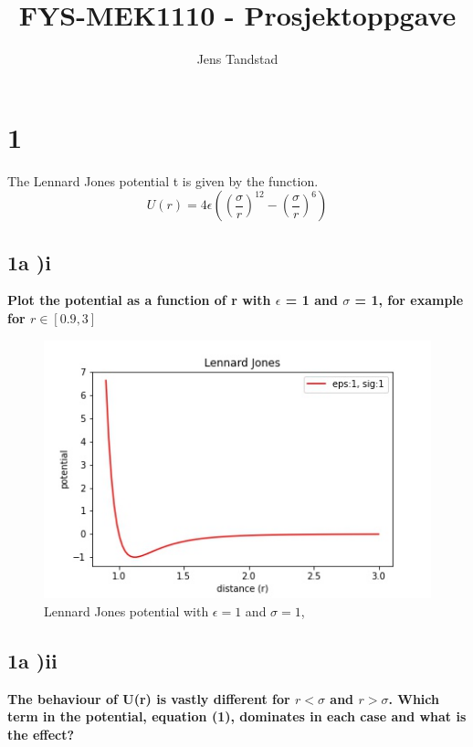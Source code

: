 \documentclass[a4paper,10pt,english]{article}
\title{FYS-MEK1110 - Prosjektoppgave}
\author{Jens Tandstad}
\begin{document}
\maketitle
\newpage

\section*{1}
The Lennard Jones potential t is given by the function.
\begin{equation}
U(r) = 4\epsilon \left(   (\frac{\sigma}{r})^{12} -   (\frac{\sigma}{r})^6 \right)
\end{equation}

\subsection*{1a )i}
\textbf{Plot the potential as a function of r with $\epsilon$ = 1 and $\sigma$ = 1, for example for $r \in [0.9, 3]$}
\begin{figure}[h!]
        \centering 
        \includegraphics[scale=0.6]{1a_i.jpg} 
        \caption{Lennard Jones potential with $\epsilon = 1$ and $\sigma = 1$, }
        \label{fig:eksempelbilde1}
\end{figure}

\subsection*{1a )ii}
\textbf{The behaviour of U(r) is vastly different for $r < \sigma$ and $r > \sigma$. Which term in the potential, equation (1),
dominates in each case and what is the effect?}
\end{document}
